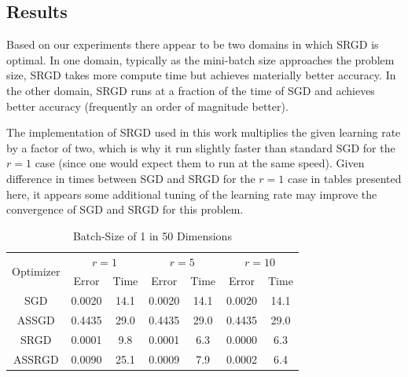 \documentclass[conference,compsoc]{IEEEtran}
\begin{document}
\subsection{Results}
Based on our experiments there appear to be two domains in which SRGD is
optimal. In one domain, typically as the mini-batch size approaches the
problem size, SRGD takes more compute time but achieves materially better
accuracy. In the other domain, SRGD runs at a fraction of the time of
SGD and achieves better accuracy (frequently an order of magnitude better).

The implementation of SRGD used in this work multiplies the given learning
rate by a factor of two, which is why it run slightly faster than standard SGD
for the $r = 1$ case (since one would expect them to run at the same speed).
Given difference in times between SGD and SRGD for the $r = 1$ case in tables
presented here, it appears some additional tuning of the learning rate may
improve the convergence of SGD and SRGD for this problem.

\begin{table}[!t]
\renewcommand{\arraystretch}{1.3}
\caption{Batch-Size of 1 in 50 Dimensions}
\label{tab:d50mb1}
\centering
\begin{tabular}{|c||c|c|c|c|c|c|}
\hline
\multirow{2}{*}{Optimizer} &
    \multicolumn{2}{c}{$r = 1$} &
    \multicolumn{2}{c}{$r = 5$} &
    \multicolumn{2}{c|}{$r = 10$}\\
    & Error & Time & Error & Time & Error & Time \\
    \hline
    SGD & 0.0020 & 14.1 & 0.0020 & 14.1 & 0.0020 & 14.1\\
    \hline
    ASSGD & 0.4435 & 29.0 & 0.4435 & 29.0 & 0.4435 & 29.0\\ 
    \hline
    SRGD & 0.0001 & 9.8 & 0.0001 & 6.3 & 0.0000 & 6.3\\
    \hline
    ASSRGD & 0.0090 & 25.1 & 0.0009 & 7.9 & 0.0002 & 6.4\\
\hline
\end{tabular}
\end{table}
\end{document}

